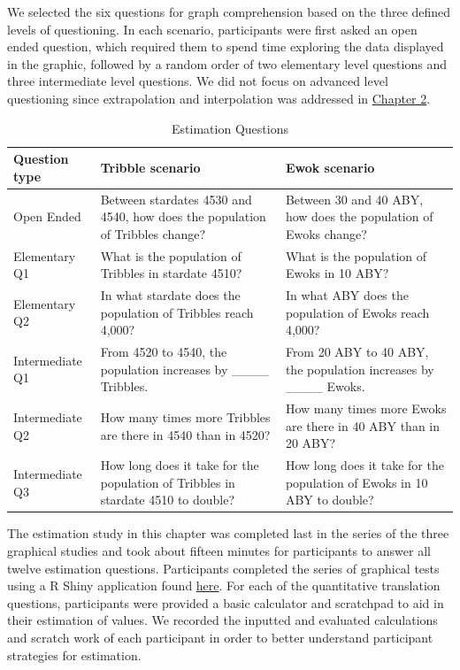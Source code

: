 \documentclass[print]{nuthesis}
\begin{document}
We selected the six questions  for graph comprehension based on the three defined levels of questioning.
In each scenario, participants were first asked an open ended question, which required them to spend time exploring the data displayed in the graphic, followed by a random order of two elementary level questions and three intermediate level questions.
We did not focus on advanced level questioning since extrapolation and interpolation was addressed in \protect\hyperlink{youdrawit}{Chapter 2}.

\begin{table}

\caption{\label{tab:estimation-questions-table}Estimation Questions}
\centering
\begin{tabular}[t]{l>{\raggedright\arraybackslash}p{10em}>{\raggedright\arraybackslash}p{10em}}
\toprule
Question type & Tribble scenario & Ewok scenario\\
\midrule
Open Ended & Between stardates 4530 and 4540, how does the population of Tribbles change? & Between 30 and 40 ABY, how does the population of Ewoks change?\\
Elementary Q1 & What is the population of Tribbles in stardate 4510? & What is the population of Ewoks in 10 ABY?\\
Elementary Q2 & In what stardate does the population of Tribbles reach 4,000? & In what ABY does the population of Ewoks reach 4,000?\\
Intermediate Q1 & From 4520 to 4540, the population increases by \_\_\_\_ Tribbles. & From 20 ABY to 40 ABY, the population increases by \_\_\_\_ Ewoks.\\
Intermediate Q2 & How many times more Tribbles are there in 4540 than in 4520? & How many times more Ewoks are there in 40 ABY than in 20 ABY?\\
\addlinespace
Intermediate Q3 & How long does it take for the population of Tribbles in stardate 4510 to double? & How long does it take for the population of Ewoks in 10 ABY to double?\\
\bottomrule
\end{tabular}
\end{table}

The estimation study in this chapter was completed last in the series of the three graphical studies and took about fifteen minutes for participants to answer all twelve estimation questions.
Participants completed the series of graphical tests using a R Shiny application found \href{https://shiny.srvanderplas.com/perception-of-statistical-graphics/}{here}.
For each of the quantitative translation questions, participants were provided a basic calculator and scratchpad to aid in their estimation of values.
We recorded the inputted and evaluated calculations and scratch work of each participant in order to better understand participant strategies for estimation.
\end{document}
